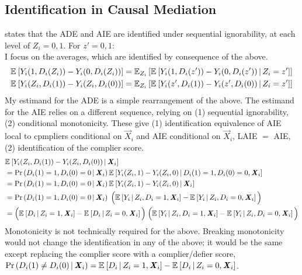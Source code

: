 \subsection{Identification in Causal Mediation}
\label{appendix:identification}
\citet[Theorem~1]{imai2010identification} states that the ADE and AIE are identified under sequential ignorability, at each level of $Z_i = 0,1$.
For $z' = 0,1$: \\
I focus on the averages, which are identified by consequence of the above.
\begin{align*}
    \E{ Y_i(1, D_i(Z_i)) - Y_i(0, D_i(Z_i))}
    &= \E[Z_i]{\Egiven{ Y_i(1, D_i(z')) - Y_i(0, D_i(z'))}{Z_i = z'}} \\
    \E{ Y_i(Z_i, D_i(1)) - Y_i(Z_i, D_i(0))}
    & = \E[Z_i]{\Egiven{ Y_i(z', D_i(1)) - Y_i(z', D_i(0))}{Z_i = z'}}
\end{align*}
My estimand for the ADE is a simple rearrangement of the above.
The estimand for the AIE relies on a different sequence, relying on (1) sequential ignorability, (2) conditional monotonicity.
These give (1) identification equivalence of AIE local to cpmpliers conditional on $\vec X_i$ and AIE conditional on $\vec X_i$, LAIE $=$ AIE, (2) identification of the complier score.
\begin{align*}
    & \Egiven{ Y_i(Z_i, D_i(1)) - Y_i(Z_i, D_i(0))}{\vec X_i} \\
    & = \Probgiven{D_i(1) = 1, D_i(0) = 0}{\vec X_i}
        \Egiven{ Y_i(Z_i, 1) - Y_i(Z_i, 0)}{D_i(1) = 1, D_i(0) = 0, \vec X_i} \\
    & = \Probgiven{D_i(1) = 1, D_i(0) = 0}{\vec X_i}
        \Egiven{ Y_i(Z_i, 1) - Y_i(Z_i, 0)}{\vec X_i} \\
    & = \Probgiven{D_i(1) = 1, D_i(0) = 0}{\vec X_i}
        \; \Big( \Egiven{Y_i}{Z_i, D_i = 1, \vec X_i}
            - \Egiven{Y_i}{Z_i, D_i = 0, \vec X_i} \Big) \\
    & = \Big( \Egiven{D_i}{Z_i = 1, \vec X_i} - \Egiven{D_i}{Z_i = 0, \vec X_i}
        \Big) \;
        \Big( \Egiven{Y_i}{Z_i, D_i = 1, \vec X_i}
            - \Egiven{Y_i}{Z_i, D_i = 0, \vec X_i} \Big)
\end{align*}
Monotonicity is not technically required for the above.
Breaking monotonicity would not change the identification in any of the above; it would be the same except replacing the complier score with a complier/defier score, $\Probgiven{D_i(1) \neq D_i(0)}{\vec X_i} = \Egiven{D_i}{Z_i = 1, \vec X_i} - \Egiven{D_i}{Z_i = 0, \vec X_i}$.

